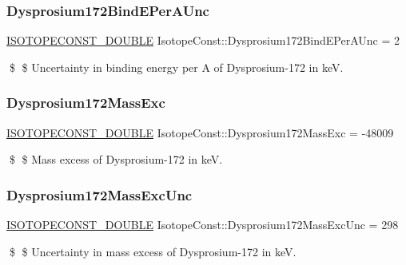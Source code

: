 \subsubsection{\texorpdfstring{Dysprosium172\+Bind\+E\+Per\+A\+Unc}{Dysprosium172BindEPerAUnc}}
{\footnotesize\ttfamily \mbox{\hyperlink{group___isotope_const-_macros_ga8f45a7272ce02c0b4c65c44636ed719a}{I\+S\+O\+T\+O\+P\+E\+C\+O\+N\+S\+T\+\_\+\+D\+O\+U\+B\+LE}} Isotope\+Const\+::\+Dysprosium172\+Bind\+E\+Per\+A\+Unc = 2}

\$ \$ Uncertainty in binding energy per A of Dysprosium-\/172 in keV. \mbox{\label{group___isotope_const-_dysprosium-_dy172_gaf0422b3306b30a3f86c16621b4b2980d}} 
\subsubsection{\texorpdfstring{Dysprosium172\+Mass\+Exc}{Dysprosium172MassExc}}
{\footnotesize\ttfamily \mbox{\hyperlink{group___isotope_const-_macros_ga8f45a7272ce02c0b4c65c44636ed719a}{I\+S\+O\+T\+O\+P\+E\+C\+O\+N\+S\+T\+\_\+\+D\+O\+U\+B\+LE}} Isotope\+Const\+::\+Dysprosium172\+Mass\+Exc = -\/48009}

\$ \$ Mass excess of Dysprosium-\/172 in keV. \mbox{\label{group___isotope_const-_dysprosium-_dy172_ga6b5c331025b56cd4348faa992e30e75e}} 
\subsubsection{\texorpdfstring{Dysprosium172\+Mass\+Exc\+Unc}{Dysprosium172MassExcUnc}}
{\footnotesize\ttfamily \mbox{\hyperlink{group___isotope_const-_macros_ga8f45a7272ce02c0b4c65c44636ed719a}{I\+S\+O\+T\+O\+P\+E\+C\+O\+N\+S\+T\+\_\+\+D\+O\+U\+B\+LE}} Isotope\+Const\+::\+Dysprosium172\+Mass\+Exc\+Unc = 298}

\$ \$ Uncertainty in mass excess of Dysprosium-\/172 in keV. \mbox{\label{group___isotope_const-_dysprosium-_dy172_ga3d5ca52e0b879cf66da6915edecd5221}} 
